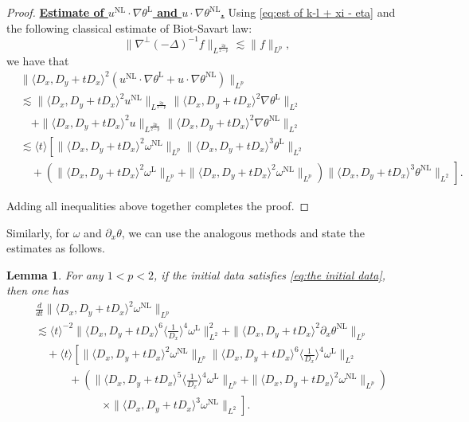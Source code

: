 \documentclass[reqno, 12pt]{amsart} %
\theoremstyle{plain} %
\newtheorem{Lem}[Thm]{Lemma}     %
\theoremstyle{definition}
\theoremstyle{remark}
\numberwithin{equation}{section} %
\newcommand{\lt}{\left}
\newcommand{\rt}{\right}
\newcommand{\px}{\partial_x}
\begin{document}
\begin{proof}
		\underline{\bf Estimate of $u^{\mathrm{NL}} \cdot \nabla \theta^{\mathrm{L}}$ and $u \cdot \nabla \theta^{\mathrm{NL}}$.}
		Using \eqref{eq:est of k-l + xi - eta} and the following classical estimate of Biot-Savart law:
		\begin{equation} \label{eq:Biot-Savart law}
			\|\nabla^{\perp}(-\Delta)^{-1} f\|_{L^{\frac{2 p}{2-p}}} \lesssim\|f\|_{L^p},
		\end{equation}
		we have that
		$$
		\begin{aligned}
			& \|\langle D_x, D_y+t D_x\rangle^2\left(u^{\mathrm{NL}} \cdot \nabla \theta^{\mathrm{L}}  +u \cdot \nabla \theta^{\mathrm{NL}}\right)\|_{L^p} \\
			& \lesssim\|\langle D_x, D_y+t D_x\rangle^2 u^{\mathrm{NL}}\|_{L^{\frac{2 p}{2-p}}}\|\langle D_x, D_y+t D_x\rangle^2 \nabla \theta^{\mathrm{L}}\|_{L^2} \\
			& \quad+\|\langle D_x, D_y+t D_x\rangle^2 u\|_{L^{\frac{2 p}{2-p}}}\|\langle D_x, D_y+t D_x\rangle^2 \nabla \theta^{\mathrm{NL}}\|_{L^2} \\
			& \lesssim\langle t\rangle\left[ \|\langle D_x, D_y+t D_x\rangle^2 \omega^{\mathrm{NL}}\|_{L^p}\|\langle D_x, D_y+t D_x\rangle^3 \theta^{\mathrm{L}}\|_{L^2}\right. \\
			& \left.\quad+(\|\langle D_x, D_y+t D_x\rangle^2 \omega^{\mathrm{L}}\|_{L^p}+\|\langle D_x, D_y+t D_x\rangle^2 \omega^{\mathrm{NL}}\|_{L^p})\|\langle D_x, D_y+t D_x\rangle^3 \theta^{\mathrm{NL}}\|_{L^2}\right] .
		\end{aligned}
		$$
		
		Adding all inequalities above together completes the proof.
	\end{proof}
	Similarly, for $\omega$ and $\px \theta$, we can use the analogous methods and state the estimates as follows.
	\begin{Lem} \label{lem:temp2}
		For any $1<p<2$, if the initial data satisfies \eqref{eq:the initial data}, then one has
		$$
		\begin{aligned}
			& \frac{d}{d t}\|\langle D_x, D_y+t D_x\rangle^2 \omega^{\mathrm{NL}}\|_{L^p} \\
			&\lesssim \langle t\rangle^{-2} \|\langle D_x, D_y+t D_x\rangle^6 \langle\frac{1}{D_x}\rangle^4 \omega^{\mathrm{L}}\|_{L^2}^2 +   \|\langle D_x, D_y+t D_x\rangle^2 \px \theta^{\mathrm{NL}} \|_{L^p}  \\
			& \quad+\langle t\rangle\left[ \|\langle D_x, D_y+t D_x\rangle^2 \omega^{\mathrm{NL}}\|_{L^p}\|\langle D_x, D_y+t D_x\rangle^6 \langle\frac{1}{D_x}\rangle^4 \omega^{\mathrm{L}}\|_{L^2}\right. \\
			& \left.\quad\quad \quad+\left(\|\langle D_x, D_y+t D_x\rangle^5 \langle\frac{1}{D_x}\rangle^4 \omega^{\mathrm{L}}\|_{L^p}+\|\langle D_x, D_y+t D_x\rangle^2 \omega^{\mathrm{NL}}\|_{L^p}\right) \rt. \\
			& \lt.\qquad\qquad\qquad\times\|\langle D_x, D_y+t D_x\rangle^3 \omega^{\mathrm{NL}}\|_{L^2}\right].
		\end{aligned}
		$$
	\end{Lem}
	
\end{document}
